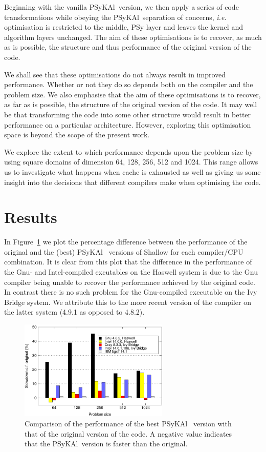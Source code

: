 \documentclass{IOS-Book-Article}
\newcommand{\psykal}{{PS}y{KA}l\ }
\begin{document}
Beginning with the vanilla \psykal version, we then apply a series of
code transformations while obeying the \psykal separation of concerns,
{\it i.e.} optimisation is restricted to the middle, {PS}y layer and
leaves the kernel and algorithm layers unchanged. The aim of these
optimisations is to recover, as much as is possible, the structure and
thus performance of the original version of the code.

We shall see that these optimisations do not always result in improved
performance. Whether or not they do so depends both on the compiler
and the problem size. We also emphasise that the aim of these
optimisations is to recover, as far as is possible, the structure of
the original version of the code. It may well be that transforming the
code into some other structure would result in better performance on a
particular architecture. However, exploring this optimisation space is
beyond the scope of the present work.

We explore the extent to which performance depends upon the problem
size by using square domains of dimension 64, 128, 256, 512 and
1024. This range allows us to investigate what happens when cache is
exhausted as well as giving us some insight into the decisions that
different compilers make when optimising the code.

\section{Results}

In Figure~\ref{FIG_slowdown_summary} we plot the percentage difference
between the performance of the original and the (best) \psykal
versions of Shallow for each compiler/CPU combination.  It is clear
from this plot that the difference in the performance of the Gnu- and
Intel-compiled excutables on the Haswell system is due to the Gnu
compiler being unable to recover the performance achieved by the
original code. In contrast there is no such problem for the
Gnu-compiled executable on the Ivy Bridge system. We attribute this to
the more recent version of the compiler on the latter system (4.9.1 as
opposed to 4.8.2).

\begin{figure}[!t]
\centering
\includegraphics[width=2.8in]{slowdown_summary}
\caption{Comparison of the performance of the best \psykal
version with that of the original version of the code. A negative value 
indicates that the \psykal version is faster than the original.}
\label{FIG_slowdown_summary}
\end{figure}
\end{document}
